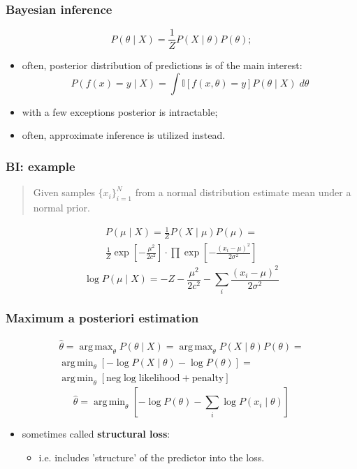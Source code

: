 \documentclass[mathserif, aspectratio=43]{beamer}
\DeclareMathOperator*{\argmin}{\mathrm{arg\,min}}
\DeclareMathOperator*{\argmax}{\mathrm{arg\,max}}
\begin{document}
\begin{frame}[fragile]
\frametitle{Bayesian inference}
\begin{equation*}
  P(\theta \mid X) = \frac{1}{Z} P(X \mid \theta) P(\theta);
\end{equation*}
\begin{itemize}
\item often, posterior distribution of predictions is of the main interest:
$$P(f(x) = y \mid X) = \int \mathbb{I}\left[ f(x, \theta) = y \right] P(\theta \mid X)\;d\theta$$
\item with a few exceptions posterior is intractable;
\item often, approximate inference is utilized instead.
\end{itemize}

\end{frame}


\begin{frame}[fragile]
\frametitle{BI: example}
\begin{quote}
Given samples $\{x_i\}^N_{i = 1}$ from a normal distribution estimate mean under a normal prior.

\end{quote}
\begin{multline*}
  P(\mu \mid X) = \frac{1}{Z} P(X \mid \mu) P(\mu) = \\
    \frac{1}{Z} \exp\left[ -\frac{\mu ^ 2}{2 c^2}\right] \cdot \prod \exp\left[ -\frac{(x_i - \mu) ^ 2}{2 \sigma^2}\right]
\end{multline*}
\vspace*{5mm}
\begin{equation*}
  \log P(\mu \mid X) = -Z -\frac{\mu ^ 2}{2 c^2} -\sum_i \frac{(x_i - \mu) ^ 2}{2 \sigma^2}
\end{equation*}

\end{frame}


\begin{frame}[fragile]
\frametitle{Maximum a posteriori estimation}
\begin{multline*}
  \hat{\theta} = \argmax_\theta P(\theta \mid X) =
    \argmax_\theta P(X \mid \theta) P(\theta) =\\
    \argmin_\theta \left[  -\log P(X \mid \theta) - \log P(\theta) \right] = \\
    \argmin_\theta \left[  \mathrm{neg\;log\;likelihood} + \mathrm{penalty} \right]
\end{multline*}
\begin{equation*}
\hat{\theta} = \argmin_\theta \left[ -\log P(\theta) - \sum_i \log P(x_i \mid \theta)\right]
\end{equation*}
\begin{itemize}
\item sometimes called \textbf{structural loss}:\begin{itemize}
\item i.e. includes 'structure' of the predictor into the loss.
\end{itemize}

\end{itemize}

\end{frame}
\end{document}
